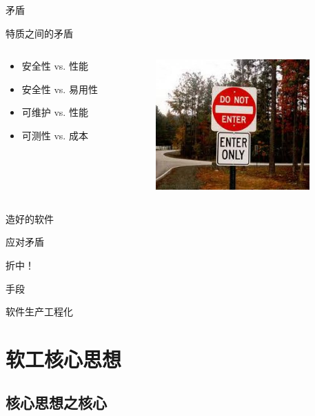 \documentclass[]{beamer}
\begin{document}
\begin{frame}{矛盾}
  \begin{block}{特质之间的矛盾}
    \begin{columns}
      \begin{column}{4cm}
        \begin{itemize}
          \item 安全性 vs. 性能
          \item 安全性 vs. 易用性
          \item 可维护 vs. 性能
          \item 可测性 vs. 成本
        \end{itemize}
      \end{column}
      \begin{column}{6cm}
        \includegraphics[height=5cm]{contradiction.jpg}
      \end{column}
    \end{columns}
  \end{block}
\end{frame}

\begin{frame}{造好的软件}
  \begin{alertblock}{应对矛盾}
    \begin{center}
      \Huge 折中！
    \end{center}
  \end{alertblock}
  \pause
  \begin{block}{手段}
    \begin{center}
      \Huge 软件生产工程化
    \end{center}
  \end{block}
\end{frame}

\section{软工核心思想}

\subsection{核心思想之核心}
\end{document}
